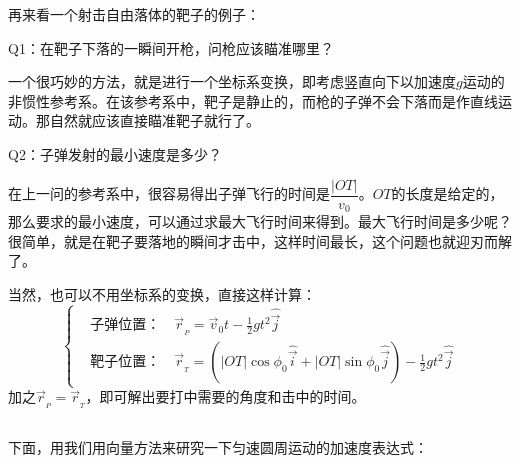再来看一个射击自由落体的靶子的例子：
\begin{center}
\end{center}

Q1：在靶子下落的一瞬间开枪，问枪应该瞄准哪里？

一个很巧妙的方法，就是进行一个坐标系变换，即考虑竖直向下以加速度$g$运动的非惯性参考系。在该参考系中，靶子是静止的，而枪的子弹不会下落而是作直线运动。那自然就应该直接瞄准靶子就行了。

Q2：子弹发射的最小速度是多少？

在上一问的参考系中，很容易得出子弹飞行的时间是$\dfrac{|OT|}{v_{0}}$。$OT$的长度是给定的，那么要求的最小速度，可以通过求最大飞行时间来得到。最大飞行时间是多少呢？很简单，就是在靶子要落地的瞬间才击中，这样时间最长，这个问题也就迎刃而解了。

当然，也可以不用坐标系的变换，直接这样计算：
\[\left\{
\begin{aligned}
  & \text{子弹位置：} \quad \vec{r}_{_P}=\vec{v}_{0}t - \frac{1}{2}gt^{2}\hat{\vec{j}} \\
  & \text{靶子位置：} \quad \vec{r}_{_T}=\left(|OT|\cos\phi_{0}\hat{\vec{i}} + |OT|\sin\phi_{0}\hat{\vec{j}}\right) - \frac{1}{2}gt^2\hat{\vec{j}}
\end{aligned}
\right.\]
加之$\vec{r}_{_P}=\vec{r}_{_T}$，即可解出要打中需要的角度和击中的时间。

\subsection[匀速圆周运动]{}
下面，用我们用向量方法来研究一下匀速圆周运动的加速度表达式：

